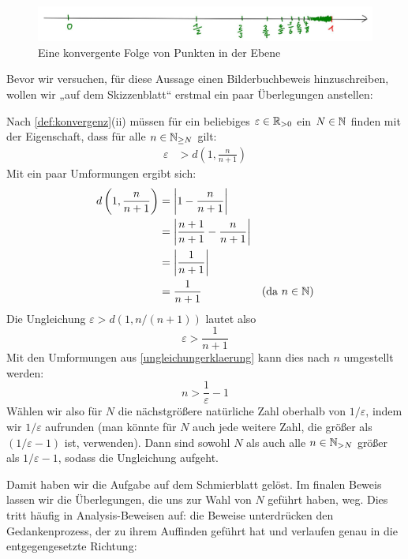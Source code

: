 \begin{figure}[ht]
    \includegraphics[width=14cm]{./_img/Konvergenzbsp.jpeg}
    \centering \caption{Eine konvergente Folge von Punkten in der Ebene}
\end{figure}


\begin{bem}
    Bevor wir versuchen, für diese Aussage einen Bilderbuchbeweis hinzuschreiben, wollen wir „auf dem Skizzenblatt“ erstmal ein paar Überlegungen anstellen:
    
    Nach \cref{def:konvergenz}(ii) müssen für ein beliebiges $\varepsilon \in \mathbb R_{>0}$ ein $N\in \mathbb N$ finden mit der Eigenschaft, dass für alle $n\in \mathbb N_{\ge N}$ gilt:
    \begin{align*}
        \varepsilon &  > d\left(1,\frac{n}{n+1}\right)
    \end{align*}
    Mit ein paar Umformungen ergibt sich:
    \begin{align*}
        d\left(1,\frac{n}{n+1}\right) & = \left| 1-\frac{n}{n+1}\right| \\
        & = \left| \frac{n+1}{n+1} - \frac{n}{n+1} \right| \\
        & = \left| \frac{1}{n+1}\right| \\
        & = \frac{1}{n+1} & (\text{da $n\in \mathbb N$})
    \end{align*}
    Die Ungleichung $\varepsilon >d(1,n/(n+1))$ lautet also
        \[ \varepsilon > \frac{1}{n+1} \]
    Mit den Umformungen aus \cref{ungleichungerklaerung} kann dies nach $n$ umgestellt werden:
        \[ n > \frac{1}{\varepsilon} -1  \]
    Wählen wir also für $N$ die nächstgrößere natürliche Zahl oberhalb von $1/\varepsilon$, indem wir $1/\varepsilon$ aufrunden (man könnte für $N$ auch jede weitere Zahl, die größer als $(1/\varepsilon -1)$ ist, verwenden). Dann sind sowohl $N$ als auch alle $n\in \mathbb N_{>N}$ größer als $1/\varepsilon- 1$, sodass die Ungleichung aufgeht.
    
    Damit haben wir die Aufgabe auf dem Schmierblatt gelöst. Im finalen Beweis lassen wir die Überlegungen, die uns zur Wahl von $N$ geführt haben, weg. Dies tritt häufig in Analysis-Beweisen auf: die Beweise unterdrücken den Gedankenprozess, der zu ihrem Auffinden geführt hat und verlaufen genau in die entgegengesetzte Richtung:
\end{bem}


